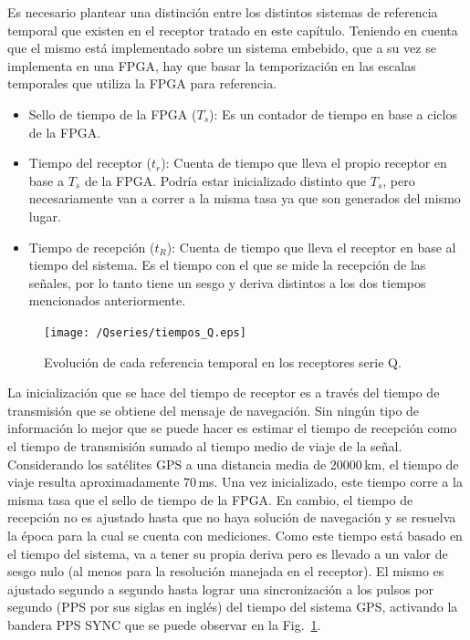 \documentclass[a4paper,12pt,oneside,onecolumn,final,openright]{book}%
\begin{document}
	Es necesario plantear una distinción entre los distintos sistemas de referencia temporal que existen en el receptor tratado en este capítulo. Teniendo en cuenta que el mismo está implementado sobre un sistema embebido, que a su vez se implementa en una FPGA, hay que basar la temporización en las escalas temporales que utiliza la FPGA para referencia. 
\begin{itemize}
	\item Sello de tiempo de la FPGA ($T_s$): Es un contador de tiempo en base a ciclos de la FPGA. 
	\item Tiempo del receptor ($t_r$): Cuenta de tiempo que lleva el propio receptor en base a $T_s$ de la FPGA. Podría estar inicializado distinto que $T_s$, pero necesariamente van a correr a la misma tasa ya que son generados del mismo lugar.
	\item Tiempo de recepción ($t_R$): Cuenta de tiempo que lleva el receptor en base al tiempo del sistema. Es el tiempo con el que se mide la recepción de las señales, por lo tanto tiene un sesgo y deriva distintos a los dos tiempos mencionados anteriormente.
\end{itemize}
\begin{figure}
    \centering
    \texttt{[image: /Qseries/tiempos\_Q.eps]}
    \caption{Evolución de cada referencia temporal en los receptores serie Q.}
    \label{fig:tiemposQ}
\end{figure}
	La inicialización que se hace del tiempo de receptor es a través del tiempo de transmisión que se obtiene del mensaje de navegación. Sin ningún tipo de información lo mejor que se puede hacer es estimar el tiempo de recepción como el tiempo de transmisión sumado al tiempo medio de viaje de la señal. Considerando los satélites GPS a una distancia media de 20000\,km, el tiempo de viaje resulta aproximadamente 70\,ms. Una vez inicializado, este tiempo corre a la misma tasa que el sello de tiempo de la FPGA. En cambio, el tiempo de recepción no es ajustado hasta que no haya solución de navegación y se resuelva la época para la cual se cuenta con mediciones. Como este tiempo está basado en el tiempo del sistema, va a tener su propia deriva pero es llevado a un valor de sesgo nulo (al menos para la resolución manejada en el receptor). El mismo es ajustado segundo a segundo hasta lograr una sincronización a los pulsos por segundo (PPS por sus siglas en inglés) del tiempo del sistema GPS, activando la bandera PPS SYNC que se puede observar en la Fig.~\ref{fig:tiemposQ}.
	
\end{document}

